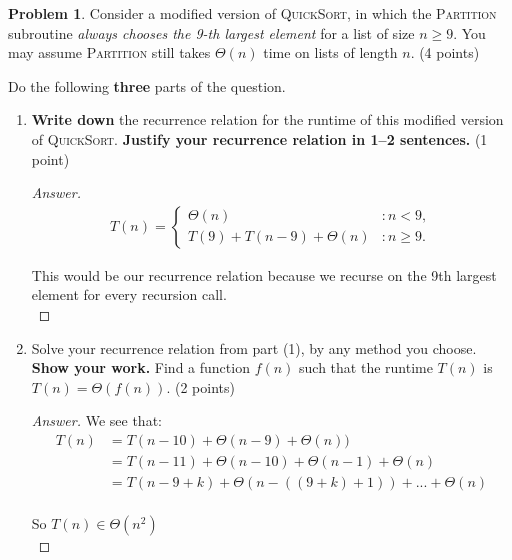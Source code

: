 \documentclass[11pt]{article}
\theoremstyle{definition}
\theoremstyle{definition}
\newtheorem{required}{Problem}
\theoremstyle{definition}
\begin{document}
\setcounter{required}{19}
\begin{required} 
Consider a modified version of \textsc{QuickSort}, in which the \textsc{Partition} subroutine \textit{always chooses the 9-th largest element} for a list of size $n \geq 9$. You may assume \textsc{Partition} still takes $\Theta(n)$ time on lists of length $n$. (4 points)

Do the following \textbf{three} parts of the question.

\begin{enumerate}
\item \textbf{Write down} the recurrence relation for the runtime of this modified version of \textsc{QuickSort}. \textbf{Justify your recurrence relation in 1--2 sentences.} (1 point)
\begin{proof}[Answer]
\begin{align*}
	T(n) = \begin{cases}
		\Theta(n) & : n < 9, \\
		T(9) + T(n-9) + \Theta(n) & : n \geq 9.
	\end{cases}
\end{align*}

This would be our recurrence relation because we recurse on the 9th largest element for every recursion call.\\

\end{proof}

\vspace{1in}

\item Solve your recurrence relation from part (1), by any method you choose. \textbf{Show your work.}  Find a function $f(n)$ such that the runtime $T(n)$ is $T(n) = \Theta(f(n))$. (2 points)
\begin{proof}[Answer]
We see that: \\
\begin{align*}
	T(n) &= T(n-10) + \Theta(n-9) + \Theta(n))\\
	&= T(n - 11) + \Theta(n - 10) + \Theta(n - 1) + \Theta(n)\\
	&= T(n - 9+k) + \Theta(n - ((9+k) + 1)) + ... + \Theta(n)
\end{align*}\\

So $T(n) \in \Theta(n^2)$\\

\end{proof}


\end{enumerate}
\end{required}
\end{document}
